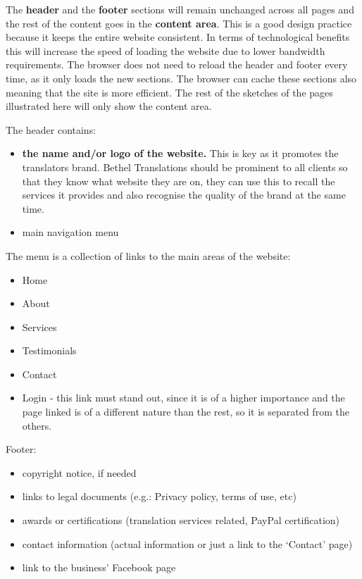 \documentclass{l3proj}
\begin{document}
The \textbf{header} and the \textbf{footer} sections will remain unchanged
across all pages and the rest of the content goes in the \textbf{content area}.
This is a good design practice because it keeps the entire website consistent. In 
terms of technological benefits this will increase the speed of loading the website 
due to lower bandwidth requirements. The browser does not need to reload the header 
and footer every time, as it only loads the new sections. The browser can cache
these sections also meaning that the site is more efficient.
The rest of the sketches of the pages illustrated here will only show the
content area.

The header contains:
\begin{itemize} \itemsep1pt \parskip0pt 
	\item \textbf{the name and/or logo of the website.} This is key as it
promotes the translators brand. Bethel Translations should be prominent to all
clients so that they know what website they are on, they can use this to recall
the services it provides and also recognise the quality of the brand at the same
time. 
	\item main navigation menu
\end{itemize}

The menu is a collection of links to the main areas of the website:
\begin{itemize} \itemsep1pt \parskip0pt 
	\item Home
	\item About
	\item Services
	\item Testimonials
	\item Contact
	\item Login - this link must stand out, since it is of a higher
	importance and the page linked is of a different nature than the rest,
	so it is separated from the others.
\end{itemize}


Footer:
\begin{itemize} \itemsep1pt \parskip0pt 
	\item copyright notice, if needed
	\item links to legal documents (e.g.: Privacy policy, terms of use, etc)
	\item awards or certifications (translation services related, 
	PayPal certification)
	\item contact information (actual information or just a link to the 
	`Contact’ page)
	\item link to the business’ Facebook page
\end{itemize}
\end{document}
